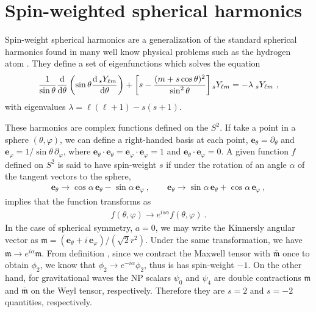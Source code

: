 
\chapter{Spin-weighted spherical harmonics}
\label{AppendixSWHs}

Spin-weight spherical harmonics are a generalization of the standard spherical harmonics
found in many well know physical problems such as the hydrogen atom \cite{Goldberg1967,Scanio1977, TorresdelCastillo2003}.
They define a set of eigenfunctions which solves the equation
\begin{equation}
	\label{eqA:diffSWSH}
	\frac{1}{\sin\theta} \frac{\dd}{\dd\theta} \left( \sin\theta 
	\frac{\dd \,\uu[s]{Y}{\ell m}}{\dd \theta} \right)
    + \left[ s - \frac{(m + s \cos\theta)^2}{\sin^2\theta} \right] \uu[s]{Y}{\ell m} = - \lambda \;\uu[s]{Y}{\ell m}~,
\end{equation}
with eigenvalues $\lambda= \ell(\ell +1) - s(s+1)$.

These harmonics are complex functions defined on the $S^2$. If take a point in a sphere $(\theta,\varphi)$, we can define a right-handed basis at each point, $\bm{e}_\theta = \partial_\theta$ and $\bm{e}_\varphi = 1/\sin\theta \,\partial_\varphi$, where $\bm{e}_\theta \cdot \bm{e}_\theta = \bm{e}_\varphi \cdot \bm{e}_\varphi = 1$ and $\bm{e}_\theta \cdot \bm{e}_\varphi = 0$.
A given function $f$ defined on $S^2$ is said to have spin-weight $s$ if under the rotation of an angle $\alpha$ of the tangent vectors to the sphere,
\begin{align}
	\label{eqC:spinTransformation}
	\bm{e}_\theta \to \cos\alpha \,\bm{e}_\theta - \sin\alpha \,\bm{e}_\varphi ~, \qquad \bm{e}_\theta \to \sin\alpha \,\bm{e}_\theta + \cos\alpha \,\bm{e}_\varphi ~,
\end{align}
implies that the function transforms as
\begin{align}
	f(\theta, \varphi) \to e^{i s \alpha} f(\theta, \varphi) ~.
\end{align}
In the case of spherical symmetry, $a=0$, we may write the Kinnersly angular vector as $\bm{\mathfrak{m}} = (\bm{e}_\theta + i \,\bm{e}_\varphi)/(\sqrt{2} r^2)$. Under the same transformation, we have $\bm{\mathfrak{m}}\to e^{i\alpha} \bm{\mathfrak{m}}$. From definition , since we contract the Maxwell tensor with $\bm{\bar{\mathfrak{m}}}$ once to obtain $\phi_2$, we know that $\phi_2 \to e^{-i \alpha} \phi_2$, thus is has spin-weight $-1$. On the other hand, for gravitational waves the NP scalars $\psi_0$ and $\psi_4$ are double contractions $\bm{\mathfrak{m}}$ and $\bm{\bar{\mathfrak{m}}}$ on the Weyl tensor, respectively. Therefore they are $s=2$ and $s=-2$ quantities, respectively.


